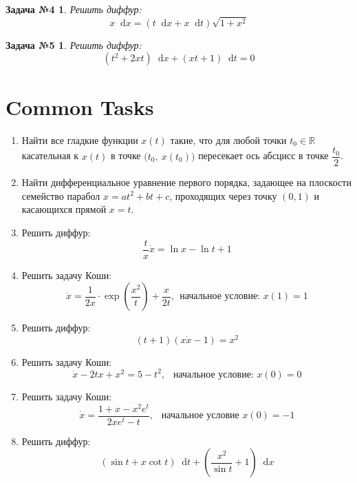\documentclass[a4paper,12pt]{article}
\newtheorem*{task4}{Задача №4}
\newtheorem*{task5}{Задача №5}
\newcommand{\R}{\mathbb{R}}
\renewcommand*\d{\mathop{}\!\mathrm{d}}
\newcommand{\dx}{\dot{x}}
\begin{document}
\begin{task4}
	Решить диффур:
	\[x\d x = (t \d x + x \d t) \sqrt{1 + x^2}\]
\end{task4}
%

\begin{task5}
	Решить диффур:
	\[(t^2 + 2xt)\d x + (xt + 1)\d t = 0\]
\end{task5}
%	


\newpage
\section{Common Tasks}

\begin{enumerate}
	\item Найти все гладкие функции $x(t)$ такие, что для любой точки $t_0 \in \R$ касательная к $x(t)$ в точке $\big(t_0,\ x(t_0)\big)$ пересекает ось абсцисс в точке $\dfrac{t_0}{2}$.
	\item Найти дифференциальное уравнение первого порядка, задающее на плоскости семейство парабол
	$x = at^2 + bt + c$, проходящих через 
	точку $(0,1)$ и касающихся прямой $x = t$. 
	\item Решить диффур: \[\dfrac{t}{x}\dx = \ln x - \ln t + 1\]
	\item Решить задачу Коши:
	\[	\dx = \dfrac{1}{2x}\cdot \exp(\frac{x^2}{t}) + \dfrac{x}{2t},\ \ 	\text{начальное условие: }x(1) = 1\]
	\item Решить диффур: \[(t + 1)(x\dx - 1) = x^2\]
	\item Решить задачу Коши: \[\dx - 2tx + x^2 = 5 - t^2,\ \ \text{ начальное условие: }x(0) = 0\]
	\item Решить задачу Коши:
	\[\dx = \dfrac{1 + x - x^2e^t}{2xe^t - t},\ \ \text{ начальное условие } x(0) = -1\]
	\item Решить диффур:
	\[(\sin t + x\cot t)\d t + \left(\dfrac{x^2}{\sin t} + 1\right)\d x\]
\end{enumerate}
\end{document}
